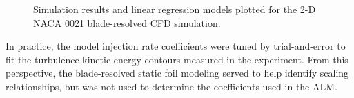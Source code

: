 \begin{figure}
    \centering 
    
    \caption{Simulation results and linear regression models plotted for the 2-D
        NACA 0021 blade-resolved CFD simulation.}
    
    \label{fig:NACA-foil-fits}
\end{figure}

In practice, the model injection rate coefficients were tuned by trial-and-error
to fit the turbulence kinetic energy contours measured in the experiment. From
this perspective, the blade-resolved static foil modeling served to help
identify scaling relationships, but was not used to determine the coefficients
used in the ALM.
